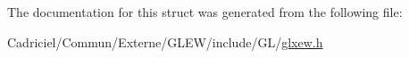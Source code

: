 The documentation for this struct was generated from the following file\-:\begin{DoxyCompactItemize}
\item 
Cadriciel/\-Commun/\-Externe/\-G\-L\-E\-W/include/\-G\-L/\hyperlink{glxew_8h}{glxew.\-h}\end{DoxyCompactItemize}
